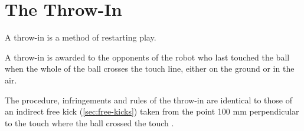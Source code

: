 \section{The Throw-In}\label{sec:throw-in}
A throw-in is a method of restarting play.

A throw-in is awarded to the opponents of the robot who last touched the ball when the whole of the
ball crosses the touch line, either on the ground or in the air.

The procedure, infringements and rules of the throw-in are identical to those of an indirect free
kick (\autoref{sec:free-kicks}) taken from the point 100 mm perpendicular to the touch  
where the ball crossed the touch  .

